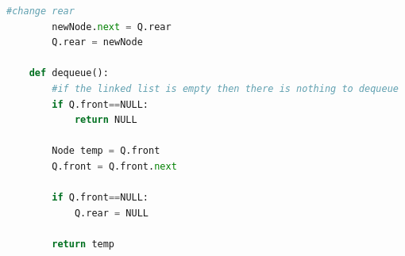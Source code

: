 \documentclass{article}
\begin{document}
\begin{enumerate}
\begin{enumerate}
\begin{latin}
\begin{flushright}
\begin{lstlisting}[language=Python]
		#change rear
		newNode.next = Q.rear
		Q.rear = newNode

	def dequeue():
		#if the linked list is empty then there is nothing to dequeue
		if Q.front==NULL:
			return NULL

		Node temp = Q.front
		Q.front = Q.front.next

		if Q.front==NULL:
			Q.rear = NULL

		return temp

			\end{lstlisting}
			\end{flushright}								
			\end{latin}

	\end{enumerate}
\end{enumerate}

\newpage
\end{document}
